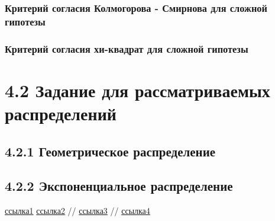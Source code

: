 \documentclass[a4paper,12pt, oneside]{book}
\begin{document}
\subsection{Критерий согласия Колмогорова - Смирнова для сложной гипотезы}

\subsection{Критерий согласия хи-квадрат для сложной гипотезы}




\chapter{4.2 Задание для рассматриваемых распределений}

\section{4.2.1 Геометрическое распределение}

\section{4.2.2 Экспоненциальное распределение}







\begin{thebibliography}{99}
	 \href{https://towardsdatascience.com/what-is-exponential-distribution-7bdd08590e2a}{ссылка1}
	  \href{https://www.statisticshowto.datasciencecentral.com/exponential-distribution/}{ссылка2}
	  // \href{http://www.ams.jhu.edu/~dan/550.435/notes/COURSENOTES435.pdf}{ссылка3}
	  // \href{http://www.obzh.ru/nad/4-3.html}{ссылка4}
\end{thebibliography}
\end{document}
